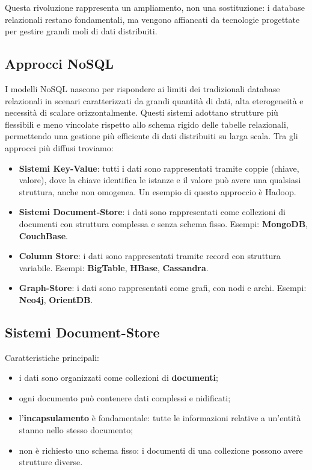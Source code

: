 Questa rivoluzione rappresenta un ampliamento, non una sostituzione: i database
relazionali restano fondamentali, ma vengono affiancati da tecnologie progettate
per gestire grandi moli di dati distribuiti.

\subsection{Approcci NoSQL}
I modelli NoSQL nascono per rispondere ai limiti dei tradizionali database
relazionali in scenari caratterizzati da grandi quantità di dati, alta
eterogeneità e necessità di scalare orizzontalmente. Questi sistemi adottano
strutture più flessibili e meno vincolate rispetto allo schema rigido delle
tabelle relazionali, permettendo una gestione più efficiente di dati distribuiti
su larga scala. Tra gli approcci più diffusi troviamo:
\begin{itemize}
    \item \textbf{Sistemi Key-Value}: tutti i dati sono rappresentati tramite coppie
    (chiave, valore), dove la chiave identifica le istanze e il valore può avere
    una qualsiasi struttura, anche non omogenea. Un esempio di questo approccio
    è Hadoop.

    \item \textbf{Sistemi Document-Store}: i dati sono rappresentati come collezioni
    di documenti con struttura complessa e senza schema fisso.
    Esempi: \textbf{MongoDB}, \textbf{CouchBase}.

    \item \textbf{Column Store}: i dati sono rappresentati tramite record con struttura variabile.
    Esempi: \textbf{BigTable}, \textbf{HBase}, \textbf{Cassandra}.

    \item \textbf{Graph-Store}: i dati sono rappresentati come grafi, con nodi e archi.
    Esempi: \textbf{Neo4j}, \textbf{OrientDB}.
\end{itemize}

\subsection{Sistemi Document-Store}
Caratteristiche principali:
\begin{itemize}
    \item i dati sono organizzati come collezioni di \textbf{documenti};
    \item ogni documento può contenere dati complessi e nidificati;
    \item l'\textbf{incapsulamento} è fondamentale: tutte le informazioni relative a un'entità
    stanno nello stesso documento;
    \item non è richiesto uno schema fisso: i documenti di una collezione possono avere
    strutture diverse.
\end{itemize}


